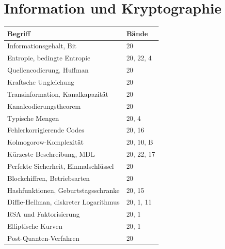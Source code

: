 \section*{Information und Kryptographie}
\nopagebreak
{\small\renewcommand{\arraystretch}{1.32}
\begin{longtable}{@{}P{5.6cm}P{2.8cm}@{}}
\toprule
\textbf{Begriff} & \textbf{Bände}\\
\midrule
\endhead
Informationsgehalt, Bit & 20\\
Entropie, bedingte Entropie & 20, 22, 4\\
Quellencodierung, Huffman & 20\\
Kraftsche Ungleichung & 20\\
Transinformation, Kanalkapazität & 20\\
Kanalcodierungstheorem & 20\\
Typische Mengen & 20, 4\\
Fehlerkorrigierende Codes & 20, 16\\
Kolmogorow-Komplexität & 20, 10, B\\
Kürzeste Beschreibung, MDL & 20, 22, 17\\
Perfekte Sicherheit, Einmalschlüssel & 20\\
Blockchiffren, Betriebsarten & 20\\
Hashfunktionen, Geburtstagsschranke & 20, 15\\
Diffie-Hellman, diskreter Logarithmus & 20, 1, 11\\
RSA und Faktorisierung & 20, 1\\
Elliptische Kurven & 20, 1\\
Post-Quanten-Verfahren & 20\\
\bottomrule
\end{longtable}}

